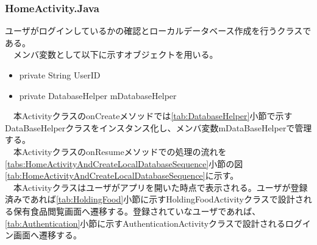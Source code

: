 \documentclass[a4j]{jarticle}
\begin{document}
\subsubsection{HomeActivity.Java}
\label{tab:Home}
ユーザがログインしているかの確認とローカルデータベース作成を行うクラスである。\\
　メンバ変数として以下に示すオブジェクトを用いる。
\begin{itemize}
\item private String UserID
\item private DatabaseHelper mDatabaseHelper
\end{itemize}
　本ActivityクラスのonCreateメソッドでは\ref{tab:DatabaseHelper}小節で示すDataBaseHelperクラスをインスタンス化し、メンバ変数mDataBaseHelperで管理する。\\
　本ActivityクラスのonResumeメソッドでの処理の流れを\ref{tabs:HomeActivityAndCreateLocalDatabaseSequence}小節の図\ref{tab:HomeActivityAndCreateLocalDatabaseSequence}に示す。\\
　本Activityクラスはユーザがアプリを開いた時点で表示される。ユーザが登録済みであれば\ref{tab:HoldingFood}小節に示すHoldingFoodActivityクラスで設計される保有食品閲覧画面へ遷移する。登録されていなユーザであれば、\ref{tab:Authentication}小節に示すAuthenticationActivityクラスで設計されるログイン画面へ遷移する。
\end{document}
